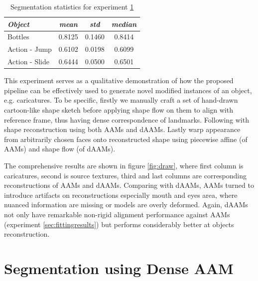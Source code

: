 \begin{table}[!b]
\small
\centering
\begin{tabular}{|l|c|c|c|}
\hline
\emph{Object}   & \emph{mean} & \emph{std} & \emph{median}\\
\hline\hline
Bottles         & 0.8125      & 0.1460     & 0.8414\\
Action - Jump   & 0.6102      & 0.0198     & 0.6099\\
Action - Slide  & 0.6444      & 0.0500     & 0.6501\\
\hline
\end{tabular}
\caption{Segmentation statistics for experiment \ref{sec:segmentation}}
\label{tab:seg_result}
\end{table}

This experiment serves as a qualitative demonstration of how the proposed pipeline can be effectively used to generate novel modified instances of an object, e.g. caricatures. To be specific, firstly we manually craft a set of hand-drawn cartoon-like shape sketch before applying shape flow on them to align with reference frame, thus having dense correspondence of landmarks. Following with shape reconstruction using both AAMs and dAAMs. Lastly warp appearance from arbitrarily chosen faces onto reconstructed shape using piecewise affine (of AAMs) and shape flow (of dAAMs). 

The comprehensive results are shown in figure \ref{fig:draw}, where first column is caricatures, second is source textures, third and last columns are corresponding reconstructions of AAMs and dAAMs. Comparing with dAAMs, AAMs turned to introduce artifacts on reconstructions especially mouth and eyes area, where nuanced information are missing or models are overly deformed. Again, dAAMs not only have remarkable non-rigid alignment performance against AAMs (experiment \ref{sec:fittingresults}) but performs considerably better at objects reconstruction.

\section{Segmentation using Dense AAM}
\label{sec:segmentation}

